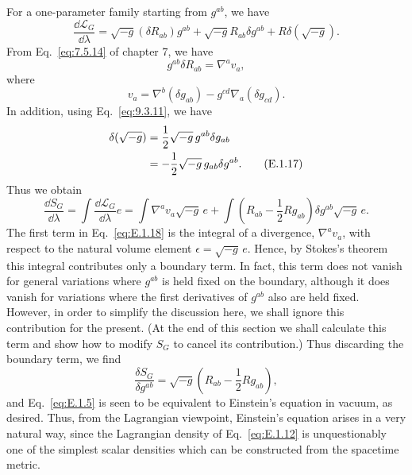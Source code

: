 For a one-parameter family starting from \(g^{ab}\), we have
\begin{equation}
  \frac{\dd\mathcal L_G}{\dd\lambda}
    =\sqrt{-g}(\delta R_{ab})g^{ab}
      +\sqrt{-g}R_{ab}\delta g^{ab}+R\delta(\sqrt{-g}).
  \tag{E.1.14}\label{eq:E.1.14}
\end{equation}
From Eq.~\eqref{eq:7.5.14} of chapter 7, we have
\begin{equation}
  g^{ab}\delta R_{ab}=\nabla^a v_a,
  \tag{E.1.15}\label{eq:E.1.15}
\end{equation}
where
\begin{equation}
  v_a=\nabla^b(\delta g_{ab})-g^{cd}\nabla_a(\delta g_{cd}).
  \tag{E.1.16}\label{eq:E.1.16}
\end{equation}
In addition, using Eq.~\eqref{eq:9.3.11}, we have
\begin{align}
  \delta(\sqrt{-g})
    &=\frac{1}{2}\sqrt{-g}\,g^{ab}\delta g_{ab}\notag\\
    &=-\frac{1}{2}\sqrt{-g}\,g_{ab}\delta g^{ab}.
  \tag{E.1.17}\label{eq:E.1.17}
\end{align}
Thus we obtain
\begin{equation}
  \frac{\dd S_G}{\dd\lambda}
    =\int\frac{\dd\mathcal L_G}{\dd\lambda}e
    =\int\nabla^a v_a\sqrt{-g}\,e
      +\int\left(R_{ab}-\frac{1}{2}Rg_{ab}\right)
        \delta g^{ab}\sqrt{-g}\,e.
  \tag{E.1.18}\label{eq:E.1.18}
\end{equation}
The first term in Eq.~\eqref{eq:E.1.18} is the integral of a divergence,
\(\nabla^a v_a\), with respect to the natural volume element
\(\epsilon=\sqrt{-g}\,e\). Hence, by Stokes's theorem this integral contributes
only a boundary term. In fact, this term does not vanish for general variations where
\(g^{ab}\) is held fixed on the boundary, although it does vanish for variations where
the first derivatives of \(g^{ab}\) also are held fixed. However, in order to simplify
the discussion here, we shall ignore this contribution for the present. (At the end of
this section we shall calculate this term and show how to modify \(S_G\) to cancel
its contribution.) Thus discarding the boundary term, we find
\begin{equation}
  \frac{\delta S_G}{\delta g^{ab}}
    =\sqrt{-g}\left(R_{ab}-\frac{1}{2}Rg_{ab}\right),
  \tag{E.1.19}\label{eq:E.1.19}
\end{equation}
and Eq.~\eqref{eq:E.1.5} is seen to be equivalent to Einstein's equation in vacuum,
as desired. Thus, from the Lagrangian viewpoint, Einstein's equation arises in a
very natural way, since the Lagrangian density of Eq.~\eqref{eq:E.1.12} is
unquestionably one of the simplest scalar densities which can be constructed from
the spacetime metric.

